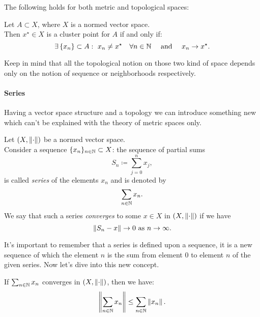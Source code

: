 The following holds for both metric and topological spaces:
\begin{prop}
	Let $A \subset X$, where $X$ is a normed vector space.\\
	Then $x^\star \in X$ is a cluster point\footnotemark{} for $A$ if and only if:
	$$
		\exists	\, \{x_n\} 
		\subset A
		: \ x_n 
		\neq x^\star 
		\quad \forall n 
		\in \mathbb N 
		\quad \text{ and } 
		\quad x_n
		\to x^\star
		.
	$$
\end{prop}

Keep in mind that all the topological notion on those two kind of space depends only on the notion of sequence or neighborhoods respectively.


\paragraph{Series} Having a vector space structure and a topology we can introduce something new which can't be explained with the theory of metric spaces only.

\begin{defn}
	Let $(X,\left\lVert\cdot\right\rVert)$ be a normed vector space.\\
	Consider a sequence $\{x_n\}_{n \in \mathbb N} \subset X$: the sequence of partial sums 
	$$
		S_n 
		\coloneqq \sum_{j=0}^n x_j
	,
	$$
	is called \emph{series} of the elements $x_n$ and is denoted by
	$$
		\sum_{n\in \mathbb N} x_n
	.
	$$	
	We say that such a series \emph{converges} to some $x\in X$ in $(X,\left\lVert\cdot\right\rVert)$ if we have 
	$$
		\left\lVert S_n - x\right\rVert 
		\to 0
		\text{ as }
		n \to \infty
	.
	$$
\end{defn}

It's important to remember that a series is defined upon a sequence, it is a new sequence of which the element $n$ is the sum from element $0$ to element $n$ of the given series. Now let's dive into this new concept.

\begin{prop} \label{generalized-triangular-inequallity}
	If $\sum_{n\in \mathbb N} x_n$ converges in $(X,\left\lVert\cdot\right\rVert)$, then we have: 
	$$
		\left\lVert\sum_{n\in\mathbb N} x_n\right\rVert 
		\leq \sum_{n \in \mathbb N} \left\lVert x_n\right\rVert
	.
	$$
\end{prop}

